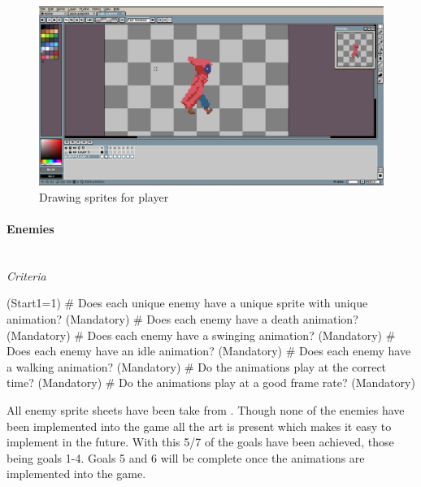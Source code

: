\documentclass{article}
\newcommand{\parBr}{\vspace{5mm}}%
\newcommand{\myparagraph}[1]{\paragraph{#1}\mbox{}\\} %
\begin{document}
\begin{figure}[H]
\centering
\includegraphics[width = 0.7\linewidth]{aseprite}
\caption{Drawing sprites for player}
\label{player_sprite}
\end{figure}

\myparagraph{Enemies}
\textit{Criteria}
\begin{easylist}
\ListProperties(Start1=1)
# Does each unique enemy have a unique sprite with unique animation? (Mandatory)
# Does each enemy have a death animation? (Mandatory)
# Does each enemy have a swinging animation? (Mandatory)
# Does each enemy have an idle animation? (Mandatory)
# Does each enemy have a walking animation? (Mandatory)
# Do the animations play at the correct time? (Mandatory)
# Do the animations play at a good frame rate? (Mandatory)
\end{easylist}

\parBr

All enemy sprite sheets have been take from \cite{pixel_art}. Though none of the enemies have been implemented into the game all the art is present which makes it easy to implement in the future. With this 5/7 of the goals have been achieved, those being goals 1-4. Goals 5 and 6 will be complete once the animations are implemented into the game.
\end{document}

